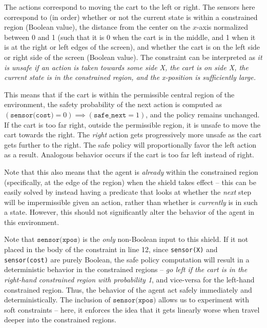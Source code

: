 The actions correspond to moving the cart to the left or right. The sensors here correspond to (in order) whether or not the current state is within a constrained region (Boolean value), the distance from the center on the $x$-axis normalized between 0 and 1 (such that it is 0 when the cart is in the middle, and 1 when it is at the right or left edges of the screen), and whether the cart is on the left side or right side of the screen (Boolean value). The constraint can be interpreted as \textit{it is unsafe if an action is taken towards some side X, the cart is on side X, the current state is in the constrained region, and the x-position is sufficiently large.} 




This means that if the cart is within the permissible central region of the environment, the safety probability of the next action is computed as $(\texttt{sensor(cost)}=0)\implies(\texttt{safe\_next}=1)$, and the policy remains unchanged. If the cart is too far right, outside the permissible region, it is unsafe to move the cart towards the right. The \textit{right} action gets progressively more unsafe as the cart gets further to the right. The safe policy will proportionally favor the left action as a result. Analogous behavior occurs if the cart is too far left instead of right.

Note that this also means that the agent is \textit{already} within the constrained region (specifically, at the edge of the region) when the shield takes effect -- this can be easily solved by instead having a predicate that looks at whether the \textit{next} step will be impermissible given an action, rather than whether is \textit{currently} is in such a state. However, this should not significantly alter the behavior of the agent in this environment.

Note that $\texttt{sensor(xpos)}$ is the \textit{only} non-Boolean input to this shield. If it not placed in the body of the constraint in line 12, since \texttt{sensor(X)} and \texttt{sensor(cost)} are purely Boolean, the safe policy computation will result in a deterministic behavior in the constrained regions -- \textit{go left if the cart is in the right-hand constrained region with probability 1}, and vice-versa for the left-hand constrained region. Thus, the behavior of the agent act safely immediately and deterministically. The inclusion of $\texttt{sensor(xpos)}$ allows us to experiment with soft constraints -- here, it enforces the idea that it gets linearly worse when travel deeper into the constrained regions.


